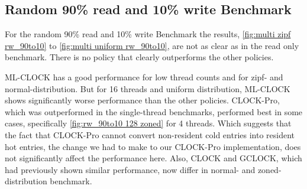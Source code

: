 \documentclass[
	12pt,
	a4paper,
	abstract,
	bibliography=totoc,
	chapterprefix,
	headings=openright,
	numbers=endperiod,
	parskip=half,
	twoside,
]{scrreprt}
\begin{document}
\subsection{Random 90\% read and 10\% write Benchmark}

For the random 90\% read and 10\% write Benchmark the results, 
\cref{fig:multi zipf rw_90to10} to \cref{fig:multi uniform rw_90to10}, 
are not as clear as in the read only benchmark.
There is no policy that clearly outperforms the other policies.

ML-CLOCK has a good performance for low thread counts and for zipf- and normal-distribution.
But for 16 threads and uniform distribution, ML-CLOCK shows significantly worse performance than the other policies.
CLOCK-Pro, which was outperformed in the single-thread benchmarks, 
performed best in some cases, specifically \cref{fig:rw_90to10 128 zoned} for 4 threads.
Which suggests that the fact that CLOCK-Pro cannot convert non-resident cold entries into resident hot entries,
the change we had to make to our CLOCK-Pro implementation, does not significantly affect the performance here.
Also, CLOCK and GCLOCK, which had previously shown similar performance, 
now differ in normal- and zoned-distribution benchmark.
\end{document}
